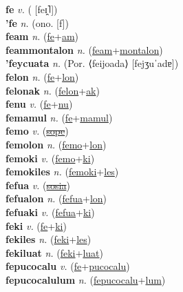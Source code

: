 \textbf{fe} \textit{v.} ( [feɪ̯˥])
 \label{fe} \\
\textbf{'fe} \textit{n.} (ono. [f])
 \label{'fe} \\
\textbf{feam} \textit{n.} (\hyperref[fe]{fe}+\hyperref[am]{am})
 \label{feam} \\
\textbf{feammontalon} \textit{n.} (\hyperref[feam]{feam}+\hyperref[montalon]{montalon})
 \label{feammontalon} \\
\textbf{'feycuata} \textit{n.} (Por. ⟨feijoada⟩ [fejʒuˈadɐ])
 \label{'feycuata} \\
\textbf{felon} \textit{n.} (\hyperref[fe]{fe}+\hyperref[lon]{lon})
 \label{felon} \\
\textbf{felonak} \textit{n.} (\hyperref[felon]{felon}+\hyperref[ak]{ak})
 \label{felonak} \\
\textbf{fenu} \textit{v.} (\hyperref[fe]{fe}+\hyperref[nu]{nu})
 \label{fenu} \\
\textbf{femamul} \textit{n.} (\hyperref[fe]{fe}+\hyperref[mamul]{mamul})
 \label{femamul} \\
\textbf{femo} \textit{v.} (\hyperref[sope]{\sout{sope}})
 \label{femo} \\
\textbf{femolon} \textit{n.} (\hyperref[femo]{femo}+\hyperref[lon]{lon})
 \label{femolon} \\
\textbf{femoki} \textit{v.} (\hyperref[femo]{femo}+\hyperref[ki]{ki})
 \label{femoki} \\
\textbf{femokiles} \textit{n.} (\hyperref[femoki]{femoki}+\hyperref[les]{les})
 \label{femokiles} \\
\textbf{fefua} \textit{v.} (\hyperref[sosia]{\sout{sosia}})
 \label{fefua} \\
\textbf{fefualon} \textit{n.} (\hyperref[fefua]{fefua}+\hyperref[lon]{lon})
 \label{fefualon} \\
\textbf{fefuaki} \textit{v.} (\hyperref[fefua]{fefua}+\hyperref[ki]{ki})
 \label{fefuaki} \\
\textbf{feki} \textit{v.} (\hyperref[fe]{fe}+\hyperref[ki]{ki})
 \label{feki} \\
\textbf{fekiles} \textit{n.} (\hyperref[feki]{feki}+\hyperref[les]{les})
 \label{fekiles} \\
\textbf{fekiluat} \textit{n.} (\hyperref[feki]{feki}+\hyperref[luat]{luat})
 \label{fekiluat} \\
\textbf{fepucocalu} \textit{v.} (\hyperref[fe]{fe}+\hyperref[pucocalu]{pucocalu})
 \label{fepucocalu} \\
\textbf{fepucocalulum} \textit{n.} (\hyperref[fepucocalu]{fepucocalu}+\hyperref[lum]{lum})
